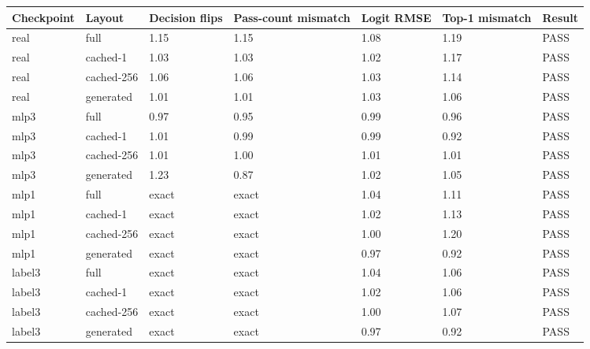 \begin{tabular}{lllllll}
\toprule
Checkpoint & Layout & Decision flips & Pass-count mismatch & Logit RMSE & Top-1 mismatch & Result \\
\midrule
real & full & 1.15 & 1.15 & 1.08 & 1.19 & PASS \\
real & cached-1 & 1.03 & 1.03 & 1.02 & 1.17 & PASS \\
real & cached-256 & 1.06 & 1.06 & 1.03 & 1.14 & PASS \\
real & generated & 1.01 & 1.01 & 1.03 & 1.06 & PASS \\
mlp3 & full & 0.97 & 0.95 & 0.99 & 0.96 & PASS \\
mlp3 & cached-1 & 1.01 & 0.99 & 0.99 & 0.92 & PASS \\
mlp3 & cached-256 & 1.01 & 1.00 & 1.01 & 1.01 & PASS \\
mlp3 & generated & 1.23 & 0.87 & 1.02 & 1.05 & PASS \\
mlp1 & full & exact & exact & 1.04 & 1.11 & PASS \\
mlp1 & cached-1 & exact & exact & 1.02 & 1.13 & PASS \\
mlp1 & cached-256 & exact & exact & 1.00 & 1.20 & PASS \\
mlp1 & generated & exact & exact & 0.97 & 0.92 & PASS \\
label3 & full & exact & exact & 1.04 & 1.06 & PASS \\
label3 & cached-1 & exact & exact & 1.02 & 1.06 & PASS \\
label3 & cached-256 & exact & exact & 1.00 & 1.07 & PASS \\
label3 & generated & exact & exact & 0.97 & 0.92 & PASS \\
\bottomrule
\end{tabular}
